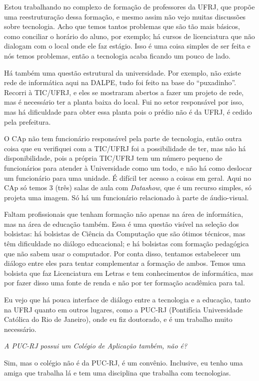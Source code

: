Estou trabalhando no complexo de formação de professores da UFRJ, que propõe uma reestruturação dessa formação, e mesmo assim não vejo muitas discussões sobre tecnologia. Acho que temos tantos problemas que são tão mais básicos, como conciliar o horário do aluno, por exemplo; há cursos de licenciatura que não dialogam com o local onde ele faz estágio. Isso é uma coisa simples de ser feita e nós temos problemas, então a tecnologia acaba ficando um pouco de lado.

Há também uma questão estrutural da universidade. Por exemplo, não existe rede de informática aqui na DALPE, tudo foi feito na base do “puxadinho”. Recorri à TIC/UFRJ, e eles se mostraram abertos a fazer um projeto de rede, mas é necessário ter a planta baixa do local. Fui no setor responsável por isso, mas há dificuldade para obter essa planta pois o prédio não é da UFRJ, é cedido pela prefeitura.

O CAp não tem funcionário responsável pela parte de tecnologia, então outra coisa que eu verifiquei com a TIC/UFRJ foi a possibilidade de ter, mas não há disponibilidade, pois a própria TIC/UFRJ tem um número pequeno de funcionários para atender à Universidade como um todo, e não há como deslocar um funcionário para uma unidade. É difícil ter acesso a coisas em geral. Aqui no CAp só temos 3 (três) salas de aula com \textit{Datashow}, que é um recurso simples, só projeta uma imagem. Só há um funcionário relacionado à parte de áudio-visual.

Faltam profissionais que tenham formação não apenas na área de informática, mas na área de educação também. Essa é uma questão visível na seleção dos bolsistas: há bolsistas de Ciência da Computação que são ótimos técnicos, mas têm dificuldade no diálogo educacional; e há bolsistas com formação pedagógica que não sabem usar o computador. Por conta disso, tentamos estabelecer um diálogo entre eles para tentar complementar a formação de ambos. Temos uma bolsista que faz Licenciatura em Letras e tem conhecimentos de informática, mas por fazer disso uma fonte de renda e não por ter formação acadêmica para tal.

Eu vejo que há pouca interface de diálogo entre a tecnologia e a educação, tanto na UFRJ quanto em outros lugares, como a PUC-RJ (Pontifícia Universidade Católica do Rio de Janeiro), onde eu fiz doutorado, e é um trabalho muito necessário.

\textit{A PUC-RJ possui um Colégio de Aplicação também, não é?}

Sim, mas o colégio não é da PUC-RJ, é um convênio. Inclusive, eu tenho uma amiga que trabalha lá e tem uma disciplina que trabalha com tecnologias.

